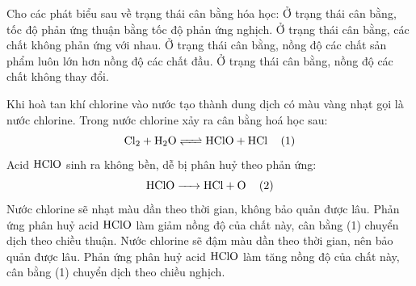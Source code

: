 \documentclass[12pt,a4paper]{article}
\begin{document}
\begin{ex}
Cho các phát biểu sau về trạng thái cân bằng hóa học:
\choiceTF
{\True Ở trạng thái cân bằng, tốc độ phản ứng thuận bằng tốc độ phản ứng nghịch.}
{Ở trạng thái cân bằng, các chất không phản ứng với nhau.}
{Ở trạng thái cân bằng, nồng độ các chất sản phẩm luôn lớn hơn nồng độ các chất đầu.}
{\True Ở trạng thái cân bằng, nồng độ các chất không thay đổi.}
\end{ex}

\begin{ex}
Khi hoà tan khí chlorine vào nước tạo thành dung dịch có màu vàng nhạt gọi là nước chlorine. Trong nước chlorine xảy ra cân bằng hoá học sau:
\[\ce{Cl2 + H2O <=> HClO + HCl \quad (1)}\]
Acid $\ce{HClO}$ sinh ra không bền, dễ bị phân huỷ theo phản ứng:
\[\ce{HClO -> HCl + O \quad (2)}\]
\choiceTF
{\True Nước chlorine sẽ nhạt màu dần theo thời gian, không bảo quản được lâu.}
{\True Phản ứng phân huỷ acid $\ce{HClO}$ làm giảm nồng độ của chất này, cân bằng (1) chuyển dịch theo chiều thuận.}
{Nước chlorine sẽ đậm màu dần theo thời gian, nên bảo quản được lâu.}
{Phản ứng phân huỷ acid $\ce{HClO}$ làm tăng nồng độ của chất này, cân bằng (1) chuyển dịch theo chiều nghịch.}
\end{ex}
\end{document}
